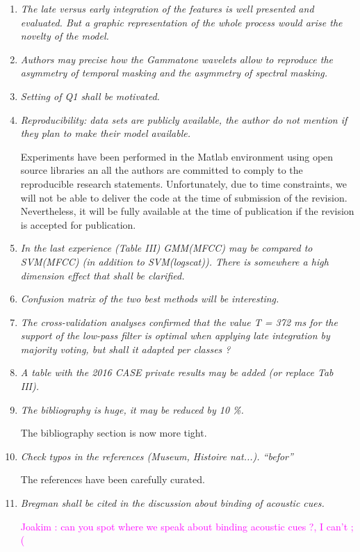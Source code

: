 \documentclass[10pt]{article}
\newcommand{\ja}[1]{\textcolor{magenta}{Joakim : #1}}
\begin{document}
\begin{enumerate}

\item \emph{The late versus early integration of the features is well presented and evaluated. But a graphic representation of the whole process would arise the novelty of the model.}

\item \emph{Authors may precise  how the Gammatone wavelets allow
to reproduce the asymmetry of temporal masking and the asymmetry of spectral masking.}

\item \emph{Setting of Q1 shall be motivated.}

\item \emph{Reproducibility:  data sets are publicly available, the author do not mention if they plan to make their model available.}

Experiments have been performed in the Matlab environment using open source libraries an all the authors are committed to comply to the reproducible research statements. Unfortunately, due to time constraints, we will not be able to deliver the code at the time of submission of the revision. Nevertheless, it will be fully available at the time of publication if the revision is accepted for publication.

\item \emph{In the last experience (Table III) GMM(MFCC) may be compared to SVM(MFCC) (in addition to SVM(logscat)). There is somewhere a high dimension effect that shall be clarified.}

\item \emph{Confusion matrix of the two best methods will be interesting.}

\item \emph{The cross-validation analyses confirmed that the value T = 372 ms for the support of the low-pass filter is optimal when applying late integration by majority voting, but shall it adapted per classes  ?}

\item \emph{A table with the 2016 CASE private results may be added (or replace Tab III).}

\item \emph{The bibliography is huge, it may be reduced by 10 \%.}

The bibliography section is now more tight. 

\item \emph{Check typos in the references (Museum, Histoire nat...). “befor”}

The references have been carefully curated.

\item \emph{Bregman shall be cited in the discussion about  binding of acoustic cues.}

\ja{can you spot where we speak about binding acoustic cues ?, I can't ;(}

\end{enumerate}
\end{document}

